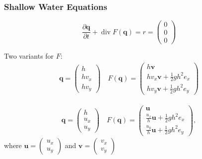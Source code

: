 \documentclass{beamer}
\newcommand{\pd}[2]{\dfrac{\partial #1}{\partial #2}}
\DeclareMathOperator{\divergence}{div}
\begin{document}
\begin{frame}
  \frametitle{Shallow Water Equations}
  \begin{equation}
    \label{eq:shallow-water-raw}
    \pd{\mathbf{q}}{t} + \divergence F(\mathbf{q}) = r = \begin{pmatrix}
      0 \\ 0\\ 0
    \end{pmatrix}
  \end{equation}

  \begin{block}{Two variants for $F$:}
    \begin{eqnarray*}
      \mathbf{q} =
      \begin{pmatrix}
        h \\ h v_x \\ h v_y
      \end{pmatrix} \quad F(\mathbf{q}) =
      \begin{pmatrix}
        h \mathbf{v} \\ h v_x \mathbf{v} + \frac{1}{2} g h^2 e_x \\ h
        v_y \mathbf{v} + \frac{1}{2} g h^2 e_y
      \end{pmatrix}
    \end{eqnarray*}

    \begin{eqnarray*}
      \mathbf{q} =
      \begin{pmatrix}
        h \\ u_x \\ u_y
      \end{pmatrix} \quad F(\mathbf{q}) =
      \begin{pmatrix}
        \mathbf{u} \\ \frac{u_x}{h} \mathbf{u} + \frac{1}{2} g h^2 e_x \\ \frac{u_y}{h} \mathbf{u}+
        \frac{1}{2} g h^2 e_y
      \end{pmatrix},
    \end{eqnarray*}
    where $\mathbf{u}=
    \begin{pmatrix}
      u_x \\ u_y
    \end{pmatrix}$ and $\mathbf{v} =
    \begin{pmatrix}
      v_x \\ v_y
    \end{pmatrix}$
  \end{block}
\end{frame}
\end{document}
